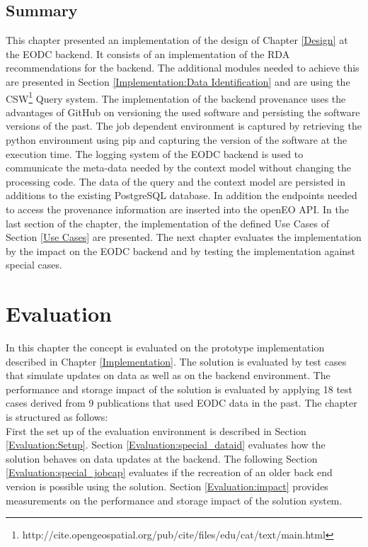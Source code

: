 \documentclass[draft,final]{vutinfth} %
\begin{document}
\section{Summary}
This chapter presented an implementation of the design of Chapter \ref{Design} at the EODC backend. It consists of an implementation of the RDA recommendations for the backend. The additional modules needed to achieve this are presented in Section \ref{Implementation:Data Identification} and are using the CSW\footnote{http://cite.opengeospatial.org/pub/cite/files/edu/cat/text/main.html} Query system. The implementation of the backend provenance uses the advantages of GitHub on versioning the used software and persisting the software versions of the past. The job dependent environment is captured by retrieving the python environment using pip and capturing the version of the software at the execution time. The logging system of the EODC backend is used to communicate the meta-data needed by the context model without changing the processing code. The data of the query and the context model are persisted in additions to the existing PostgreSQL database. In addition the endpoints needed to access the provenance information are inserted into the openEO API. In the last section of the chapter, the implementation of the defined Use Cases of Section \ref{Use Cases} are presented. The next chapter evaluates the implementation by the impact on the EODC backend and by testing the implementation against special cases.    
\chapter{Evaluation}\label{Evaluation}
In this chapter the concept is evaluated on the prototype implementation described in Chapter \ref{Implementation}. The solution is evaluated by test cases that simulate updates on data as well as on the backend environment. The performance and storage impact of the solution is evaluated by applying 18 test cases derived from 9 publications that used EODC data in the past. The chapter is structured as follows: \\
First the set up of the evaluation environment is described in Section \ref{Evaluation:Setup}. Section \ref{Evaluation:special_dataid} evaluates how the solution behaves on data updates at the backend. The following Section \ref{Evaluation:special_jobcap}  evaluates if the recreation of an older back end version is possible using the solution. Section \ref{Evaluation:impact} provides measurements on the performance and storage impact of the solution system. 
\end{document}
